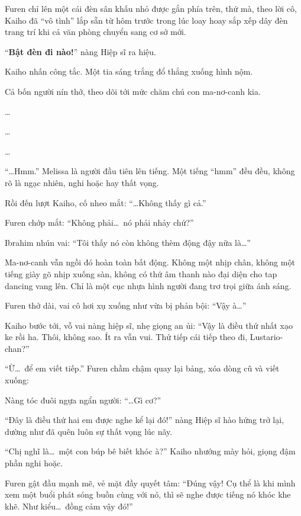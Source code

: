 \documentclass[../main.tex]{subfiles}
\begin{document}

Furen chỉ lên một cái đèn sân khấu nhỏ được gắn phía trên, thứ mà, theo lời cô, Kaiho đã ``vô tình'' lắp sẵn từ hôm trước trong lúc loay hoay sắp xếp dây đèn trang trí khi cả văn phòng chuyển sang cơ sở mới.

``\textbf{Bật đèn đi nào!}'' nàng Hiệp sĩ ra hiệu.

Kaiho nhấn công tắc. Một tia sáng trắng đổ thẳng xuống hình nộm.

Cả bốn người nín thở, theo dõi tới mức chăm chú con ma-nơ-canh kia.

\dots

\dots

\dots

``\dots Hmm.'' Melissa là người đầu tiên lên tiếng. Một tiếng ``hmm'' đều đều, không rõ là ngạc nhiên, nghi hoặc hay thất vọng.

Rồi đến lượt Kaiho, cố nheo mắt: ``\dots Không thấy gì cả.''

Furen chớp mắt: ``Không phải\dots\ nó phải nhảy chứ?''

Ibrahim nhún vai: ``Tôi thấy nó còn không thèm động đậy nữa là\dots''

Ma-nơ-canh vẫn ngồi đó hoàn toàn bất động. Không một nhịp chân, không một tiếng giày gõ nhịp xuống sàn, không có thứ âm thanh nào đại diện cho tap dancing vang lên. Chỉ là một cục nhựa hình người đang trơ trọi giữa ánh sáng.

Furen thở dài, vai cô hơi xụ xuống như vừa bị phản bội: ``Vậy à\dots''

Kaiho bước tới, vỗ vai nàng hiệp sĩ, nhẹ giọng an ủi:
``Vậy là điều thứ nhất xạo ke rồi ha. Thôi, không sao. Ít ra vẫn vui. Thử tiếp cái tiếp theo đi, Lustario-chan?''

``Ừ\dots\ để em viết tiếp.'' Furen chầm chậm quay lại bảng, xóa dòng cũ và viết xuống:


Nàng tóc đuôi ngựa ngẩn người: ``\dots Gì cơ?''

``Đây là điều thứ hai em được nghe kể lại đó!''  nàng Hiệp sĩ hào hứng trở lại, dường như đã quên luôn sự thất vọng lúc nãy.

``Chị nghĩ là\dots\ một con búp bê biết khóc à?'' Kaiho nhướng mày hỏi, giọng đậm phần nghi hoặc.

Furen gật đầu mạnh mẽ, vẻ mặt đầy quyết tâm: ``Đúng vậy! Cụ thể là khi mình xem một buổi phát sóng buồn cùng với nó, thì sẽ nghe được tiếng nó khóc khe khẽ. Như kiểu\dots\ đồng cảm vậy đó!''
\end{document}
